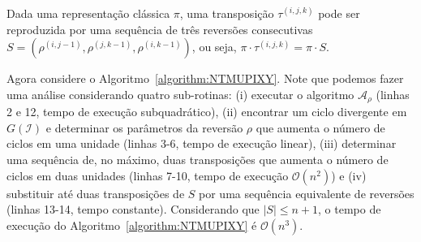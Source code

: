 \begin{remark}\label{remark:DNLEDNKT}
Dada uma representação clássica $\pi$, uma transposição $\tau^{(i,j,k)}$ pode ser reproduzida por uma sequência de três reversões consecutivas $S=(\rho^{(i,{j-1})},\rho^{(j,{k-1})},\rho^{(i,{k-1})})$, ou seja, $\pi \cdot \tau^{(i,j,k)} = \pi \cdot S$. 
\end{remark}

Agora considere o Algoritmo~\ref{algorithm:NTMUPIXY}. Note que podemos fazer uma análise considerando quatro sub-rotinas: (i)  executar o algoritmo  $\mathcal{A}_\rho$ (linhas 2 e 12, tempo de execução subquadrático), (ii) encontrar um ciclo divergente em $G(\mathcal{I})$ e determinar os parâmetros da reversão $\rho$ que aumenta o número de ciclos em uma unidade (linhas 3-6, tempo de execução linear), (iii) determinar uma sequência de, no máximo, duas transposições que aumenta o número de ciclos em duas unidades (linhas 7-10, tempo de execução $\mathcal{O}(n^2)$) e (iv) substituir até duas transposições de $S$ por uma sequência equivalente de reversões (linhas 13-14, tempo constante). Considerando que $|S| \le {n + 1}$, o tempo de execução do Algoritmo~\ref{algorithm:NTMUPIXY} é $\mathcal{O}(n^3)$.



